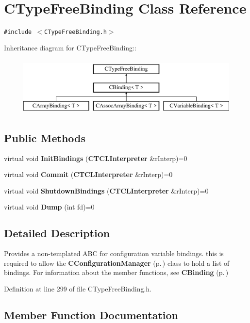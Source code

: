 \section{CType\-Free\-Binding  Class Reference}
\label{classCTypeFreeBinding}
{\tt \#include $<$CType\-Free\-Binding.h$>$}

Inheritance diagram for CType\-Free\-Binding::\begin{figure}[H]
\begin{center}
\leavevmode
\includegraphics[height=3cm]{classCTypeFreeBinding}
\end{center}
\end{figure}
\subsection*{Public Methods}
\begin{CompactItemize}
\item 
virtual void {\bf Init\-Bindings} ({\bf CTCLInterpreter} \&r\-Interp)=0
\item 
virtual void {\bf Commit} ({\bf CTCLInterpreter} \&r\-Interp)=0
\item 
virtual void {\bf Shutdown\-Bindings} ({\bf CTCLInterpreter} \&r\-Interp)=0
\item 
virtual void {\bf Dump} (int fd)=0
\end{CompactItemize}


\subsection{Detailed Description}
Provides a non-templated ABC for configuration variable bindings. this is required to allow the {\bf CConfiguration\-Manager} {\rm (p.\,\pageref{classCConfigurationManager})} class to hold a list of bindings. For information about the member functions, see {\bf CBinding} {\rm (p.\,\pageref{classCBinding})} 



Definition at line 299 of file CType\-Free\-Binding.h.

\subsection{Member Function Documentation}
